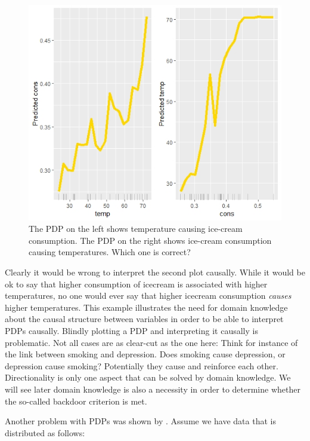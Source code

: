 \documentclass[
]{krantz}
\begin{document}
\begin{figure}

\includegraphics[width=1\linewidth]{images/ice_cream} \hfill{}

\caption{The PDP on the left shows temperature causing ice-cream consumption. The PDP on the right shows ice-cream consumption causing temperatures. Which one is correct?}\label{fig:Figure1}
\end{figure}

Clearly it would be wrong to interpret the second plot causally. While it would be ok to say that higher consumption of icecream is associated with higher temperatures, no one would ever say that higher icecream consumption \emph{causes} higher temperatures. This example illustrates the need for domain knowledge about the causal structure between variables in order to be able to interpret PDPs causally. Blindly plotting a PDP and interpreting it causally is problematic. Not all cases are as clear-cut as the one here: Think for instance of the link between smoking and depression. Does smoking cause depression, or depression cause smoking? Potentially they cause and reinforce each other. Directionality is only one aspect that can be solved by domain knowledge. We will see later domain knowledge is also a necessity in order to determine whether the so-called backdoor criterion is met.

Another problem with PDPs was shown by \citep{scholbeck}. Assume we have data that is distributed as follows:
\end{document}
